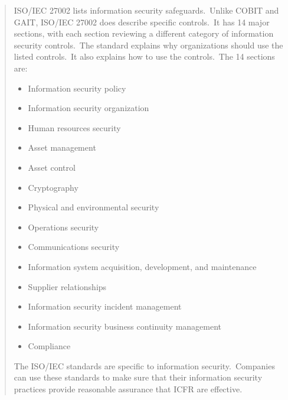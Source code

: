\begin{formal}
\begin{quote}
                             ISO/IEC 27002 lists information security safeguards.\ Unlike COBIT and GAIT, ISO/IEC 27002 does describe specific controls.\ It has 14 major sections, with each section reviewing a different category of information security controls.\ The standard explains why organizations should use the listed controls.\ It also explains how to use the controls.\ The 14 sections are:
                             \begin{itemize}
                                  \item Information security policy
                                  \item Information security organization
                                  \item Human resources security
                                  \item Asset management
                                  \item Asset control
                                  \item Cryptography
                                  \item Physical and environmental security
                                  \item Operations security
                                  \item Communications security
                                  \item Information system acquisition, development, and maintenance
                                  \item Supplier relationships
                                  \item Information security incident management
                                  \item Information security business continuity management
                                  \item Compliance
                              \end{itemize}
                              
                              The ISO/IEC standards are specific to information security.\ Companies can use these standards to make sure that their information security practices provide reasonable assurance that ICFR are effective.\cite{grama2022}
                              
          \end{quote}
          
\end{formal}
